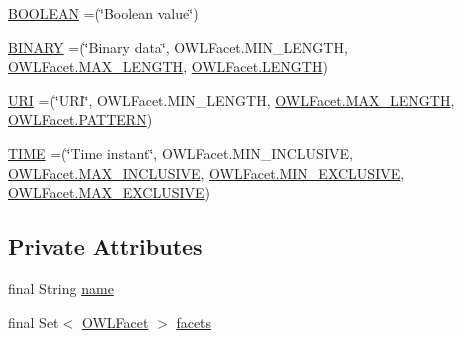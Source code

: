 \begin{DoxyCompactItemize}
\item 
\hyperlink{enumorg_1_1semanticweb_1_1owlapi_1_1vocab_1_1_o_w_l2_datatype_1_1_category_ac27b3937d6bdaeb8b7551629cb92a763}{B\-O\-O\-L\-E\-A\-N} =(\char`\"{}Boolean value\char`\"{})
\item 
\hyperlink{enumorg_1_1semanticweb_1_1owlapi_1_1vocab_1_1_o_w_l2_datatype_1_1_category_a59bccb8d820aa1f7ab21c1ca3166f840}{B\-I\-N\-A\-R\-Y} =(\char`\"{}Binary data\char`\"{}, O\-W\-L\-Facet.\-M\-I\-N\-\_\-\-L\-E\-N\-G\-T\-H, \hyperlink{enumorg_1_1semanticweb_1_1owlapi_1_1vocab_1_1_o_w_l_facet_ad14fff0cda2f326a486b922076016d19}{O\-W\-L\-Facet.\-M\-A\-X\-\_\-\-L\-E\-N\-G\-T\-H}, \hyperlink{enumorg_1_1semanticweb_1_1owlapi_1_1vocab_1_1_o_w_l_facet_a94848a88879ba59175ec96c477ca9ae2}{O\-W\-L\-Facet.\-L\-E\-N\-G\-T\-H})
\item 
\hyperlink{enumorg_1_1semanticweb_1_1owlapi_1_1vocab_1_1_o_w_l2_datatype_1_1_category_a0b2cea4b5db3cac9d91806ba73db9125}{U\-R\-I} =(\char`\"{}U\-R\-I\char`\"{}, O\-W\-L\-Facet.\-M\-I\-N\-\_\-\-L\-E\-N\-G\-T\-H, \hyperlink{enumorg_1_1semanticweb_1_1owlapi_1_1vocab_1_1_o_w_l_facet_ad14fff0cda2f326a486b922076016d19}{O\-W\-L\-Facet.\-M\-A\-X\-\_\-\-L\-E\-N\-G\-T\-H}, \hyperlink{enumorg_1_1semanticweb_1_1owlapi_1_1vocab_1_1_o_w_l_facet_aac44b7eb7db8e6f75fccbfea32296169}{O\-W\-L\-Facet.\-P\-A\-T\-T\-E\-R\-N})
\item 
\hyperlink{enumorg_1_1semanticweb_1_1owlapi_1_1vocab_1_1_o_w_l2_datatype_1_1_category_ab744eaae59f144b9950cf5e14ff8e42e}{T\-I\-M\-E} =(\char`\"{}Time instant\char`\"{}, O\-W\-L\-Facet.\-M\-I\-N\-\_\-\-I\-N\-C\-L\-U\-S\-I\-V\-E, \hyperlink{enumorg_1_1semanticweb_1_1owlapi_1_1vocab_1_1_o_w_l_facet_ac9a64ef90c0effd4c743c76c93dc7a6f}{O\-W\-L\-Facet.\-M\-A\-X\-\_\-\-I\-N\-C\-L\-U\-S\-I\-V\-E}, \hyperlink{enumorg_1_1semanticweb_1_1owlapi_1_1vocab_1_1_o_w_l_facet_a27c52fbbfdcc423521b725bc8a2dc949}{O\-W\-L\-Facet.\-M\-I\-N\-\_\-\-E\-X\-C\-L\-U\-S\-I\-V\-E}, \hyperlink{enumorg_1_1semanticweb_1_1owlapi_1_1vocab_1_1_o_w_l_facet_aeb6a9174b60549039a19540cae7d3525}{O\-W\-L\-Facet.\-M\-A\-X\-\_\-\-E\-X\-C\-L\-U\-S\-I\-V\-E})
\end{DoxyCompactItemize}
\subsection*{Private Attributes}
\begin{DoxyCompactItemize}
\item 
final String \hyperlink{enumorg_1_1semanticweb_1_1owlapi_1_1vocab_1_1_o_w_l2_datatype_1_1_category_ae213fdcd31989462299c102900ccb23e}{name}
\item 
final Set$<$ \hyperlink{enumorg_1_1semanticweb_1_1owlapi_1_1vocab_1_1_o_w_l_facet}{O\-W\-L\-Facet} $>$ \hyperlink{enumorg_1_1semanticweb_1_1owlapi_1_1vocab_1_1_o_w_l2_datatype_1_1_category_ae7070a1169dfe449115e8f23fc9c6f9b}{facets}
\end{DoxyCompactItemize}


